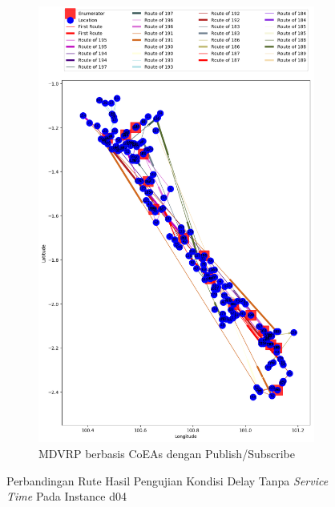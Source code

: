\begin{figure}[H]\ContinuedFloat
	\centering
	\begin{subfigure}[t]{\textwidth}
		\centering
		\includegraphics[width=\textwidth]{Resources/Images/delayed_5/real_m15_n100_delayed_5_pubsub_coes}
		\caption{MDVRP berbasis CoEAs dengan Publish/Subscribe}
		\label{fig:real_m15_n100_delayed_5_pubsub_coes}
	\end{subfigure}
	\caption{Perbandingan Rute Hasil Pengujian Kondisi Delay Tanpa \textit{Service Time} Pada Instance d04}
	\label{fig:real_m15_n100_delayed_5_contd}
\end{figure}


